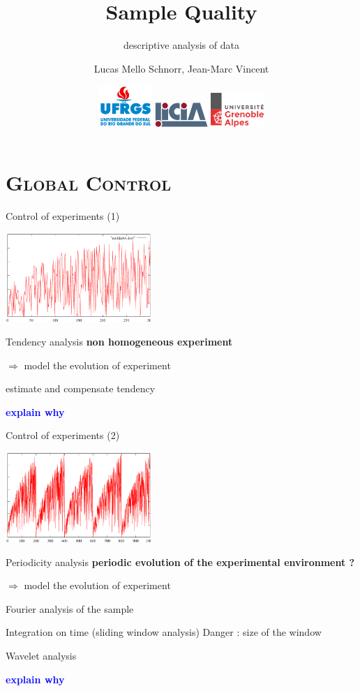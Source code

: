 \documentclass[xcolor=x11names,compress,8pt,
]{beamer}
\title[Data Characterization] %
{Sample Quality}
\subtitle{descriptive analysis of data}
\author%
{		
Lucas Mello Schnorr, Jean-Marc Vincent
}
\institute[LICIA] %
{%
{\large INF/UFRGS\\
Porto Alegre, Brazil – \mytoday}
}
\date[Porto Alegre 2018] %
{
\includegraphics[width=2cm]{logos/ufrgs2.png}\hfill
\includegraphics[width=2cm]{logos/licia-small.png}\hfill
\includegraphics[width=2cm]{logos/uga.png}
}
\renewcommand{\(}{\begin{columns}}
\renewcommand{\)}{\end{columns}}
\newcommand{\<}[1]{\begin{column}{#1}}
\renewcommand{\>}{\end{column}}
\begin{document}
\begin{frame}
\titlepage
\end{frame}
\section[{\scshape Global Control}]{{\scshape Global Control}}

\begin{frame}{Control of experiments (1)}
\begin{center}
\includegraphics[width=5.5cm]{CE-unifderiv.pdf}
\end{center}
\pause
\begin{block}{Tendency analysis}
\alert{\bf non homogeneous experiment}

$\Rightarrow$ model the evolution of experiment

estimate and compensate tendency

\textcolor{blue}{\bf explain why}
\end{block}
\end{frame}
\begin{frame}{Control of experiments (2)}
\begin{center}
\includegraphics[width=5.5cm]{CE-periode.pdf}
\end{center}
\pause
\begin{block}{Periodicity analysis}
\alert{\bf periodic evolution of the experimental environment ?}

$\Rightarrow$ model the evolution of experiment

Fourier analysis of the sample

Integration on time (sliding window analysis) Danger : size of the window

Wavelet analysis

\textcolor{blue}{\bf explain why}
\end{block}
\end{frame}
\end{document}
